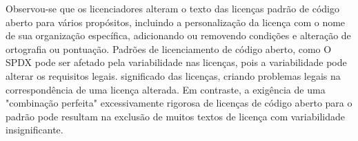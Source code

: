 Observou-se que os licenciadores alteram o texto das licenças padrão de código aberto para vários propósitos, incluindo a personalização da licença com o nome de sua organização específica, adicionando ou removendo condições e alteração de ortografia ou pontuação. Padrões de licenciamento de código aberto, como O SPDX pode ser afetado pela variabilidade nas licenças, pois a variabilidade pode alterar os requisitos legais. significado das licenças, criando problemas legais na correspondência de uma licença alterada. Em contraste, a exigência de uma "combinação perfeita" excessivamente rigorosa de licenças de código aberto para o padrão pode resultam na exclusão de muitos textos de licença com variabilidade insignificante. 